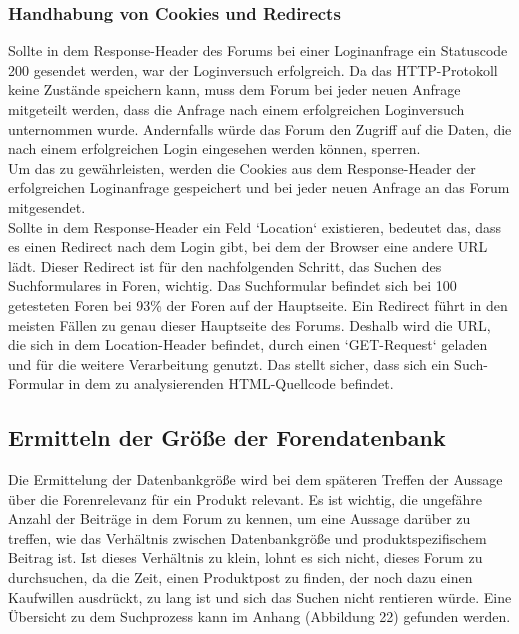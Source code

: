 \subsubsection{Handhabung von Cookies und Redirects}
Sollte in dem Response-Header des Forums bei einer Loginanfrage ein Statuscode 200 gesendet werden, war der Loginversuch erfolgreich. Da das HTTP-Protokoll keine Zustände speichern kann, muss dem Forum bei jeder neuen Anfrage mitgeteilt werden, dass die Anfrage nach einem erfolgreichen Loginversuch unternommen wurde. Andernfalls würde das Forum den Zugriff auf die Daten, die nach einem erfolgreichen Login eingesehen werden können, sperren.\\
Um das zu gewährleisten, werden die Cookies aus dem Response-Header der erfolgreichen Loginanfrage gespeichert und bei jeder neuen Anfrage an das Forum mitgesendet.\\
Sollte in dem Response-Header ein Feld `Location` existieren, bedeutet das, dass es einen Redirect nach dem Login gibt, bei dem der Browser eine andere URL lädt. Dieser Redirect ist für den nachfolgenden Schritt, das Suchen des Suchformulares in Foren, wichtig. Das Suchformular befindet sich bei 100 getesteten Foren bei 93\% der Foren auf der Hauptseite. Ein Redirect führt in den meisten Fällen zu genau dieser Hauptseite des Forums. Deshalb wird die URL, die sich in dem Location-Header befindet, durch einen `GET-Request` geladen und für die weitere Verarbeitung genutzt. Das stellt sicher, dass sich ein Such-Formular in dem zu analysierenden HTML-Quellcode befindet.


\subsection{Ermitteln der Größe der Forendatenbank}
Die Ermittelung der Datenbankgröße wird bei dem späteren Treffen der Aussage über die Forenrelevanz für ein Produkt relevant.
Es ist wichtig, die ungefähre Anzahl der Beiträge in dem Forum zu kennen, um eine Aussage darüber zu treffen, wie das Verhältnis zwischen Datenbankgröße und produktspezifischem Beitrag ist. Ist dieses Verhältnis zu klein, lohnt es sich nicht, dieses Forum zu durchsuchen, da die Zeit, einen Produktpost zu finden, der noch dazu einen Kaufwillen ausdrückt, zu lang ist und sich das Suchen nicht rentieren würde.
Eine Übersicht zu dem Suchprozess kann im Anhang (Abbildung 22) gefunden werden.
